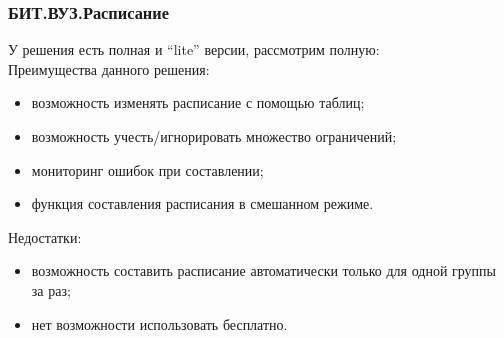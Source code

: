 \subsubsection{БИТ.ВУЗ.Расписание}
У решения есть полная и ``lite'' версии, рассмотрим полную:\\
  Преимущества данного решения:
  \begin{itemize}
    \item возможность изменять расписание с помощью таблиц;
    \item возможность учесть/игнорировать множество ограничений;
    \item мониторинг ошибок при составлении;
    \item функция составления расписания в смешанном режиме.
  \end{itemize}
  Недостатки:
  \begin{itemize}
      \item возможность составить расписание автоматически только для одной группы за раз;
      \item нет возможности использовать бесплатно.
  \end{itemize}
      


